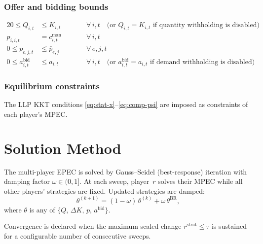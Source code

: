 \documentclass[11pt]{article}
\begin{document}
\subsubsection*{Offer and bidding bounds}

\begin{alignat}{2}
  \label{eq:q-cap}
  0 \le Q_{i,t} &\le K_{i,t}
    &&\qquad \forall\,i,t
    \quad\bigl(\text{or } Q_{i,t}=K_{i,t}
    \text{ if quantity withholding is disabled}\bigr) \\[3pt]
  \label{eq:self-offer}
  p_{i,i,t} &= c^{\mathrm{man}}_{i,t}
    &&\qquad \forall\,i,t \\[3pt]
  \label{eq:p-bounds}
  0 \le p_{e,j,t} &\le \bar{p}_{e,j}
    &&\qquad \forall\,e,j,t \\[3pt]
  \label{eq:a-bounds}
  0 \le a^{\mathrm{bid}}_{i,t} &\le a_{i,t}
    &&\qquad \forall\,i,t
    \quad\bigl(\text{or } a^{\mathrm{bid}}_{i,t}=a_{i,t}
    \text{ if demand withholding is disabled}\bigr)
\end{alignat}

\subsubsection*{Equilibrium constraints}

The LLP KKT conditions
\eqref{eq:stat-x}--\eqref{eq:comp-psi}
are imposed as constraints of each player's MPEC.

\section{Solution Method}

The multi-player EPEC is solved by Gauss--Seidel (best-response)
iteration with damping factor $\omega\in(0,1]$.  At each sweep,
player~$r$ solves their MPEC while all other players' strategies are
fixed.  Updated strategies are damped:
\[
  \theta^{(k+1)} = (1-\omega)\,\theta^{(k)} + \omega\,\theta^{\mathrm{BR}},
\]
where $\theta$ is any of $\{Q,\,\Delta K,\,p,\,a^{\mathrm{bid}}\}$.

Convergence is declared when the maximum scaled change
$r^{\mathrm{strat}} \le \tau$ is sustained for a configurable number
of consecutive sweeps.
\end{document}
